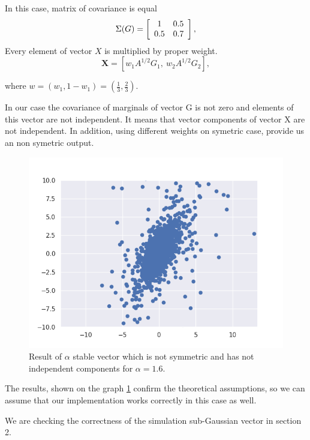 \documentclass{article}
\begin{document}
	In this case, matrix of covariance is equal
	\begin{equation*}
		\Sigma(G) = \left[{\begin{array}{*{20}c}
			1 & 0.5\\
			0.5 & 0.7\end{array} } \right],
	\end{equation*}
	Every element of vector $X$ is multiplied by proper weight.
	\begin{equation}
		\mathbf{X}=\left[w_1 A^{1 / 2} G_1,\: w_2 A^{1 / 2} G_2\right],
	\end{equation}

	where $w = (w_1, 1-w_1) = (\frac{1}{3},\frac{2}{3})$.
	
	In our case the covariance of marginals of vector G is not zero and elements of this vector are not independent. It means that vector components of vector X are not independent.
	In addition, using different weights on symetric case, provide us an non symetric output. 

	\begin{figure}[H]
		\centering
		\includegraphics[width=0.9\linewidth]{images/ex_1_c_alpha_stable_vector_simulation_symmetric_discreet_scatter}
		\caption{Result of $\alpha$ stable vector which is not symmetric and has not independent components for $\alpha=1.6$.}\label{3}
	\end{figure}
	The results, shown on the graph \ref{3} confirm the theoretical assumptions, so we can assume that our implementation works correctly in this case as well.
	
	We are checking the correctness of the simulation sub-Gaussian vector in section 2.
\end{document}

